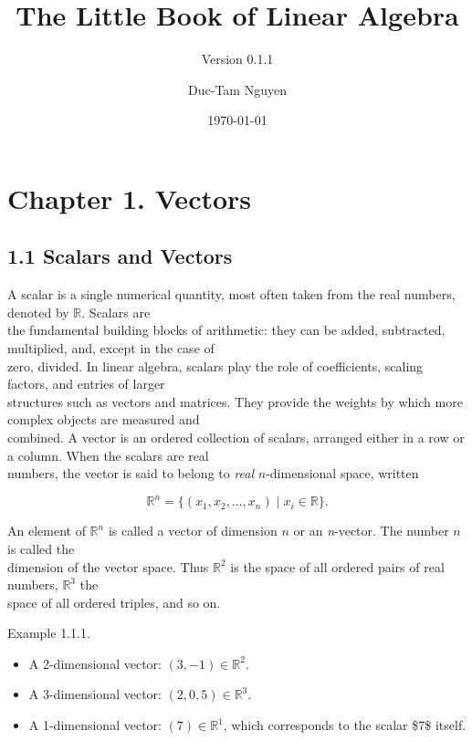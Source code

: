 \documentclass[
  12pt,
  a4paper,
]{article}
\title{The Little Book of Linear Algebra}
\subtitle{Version 0.1.1}
\author{Duc-Tam Nguyen}
\date{\today}
\let\oldsection\section
\renewcommand{\section}{\clearpage\oldsection}
\begin{document}
\maketitle

{
\hypersetup{linkcolor=}
\setcounter{tocdepth}{2}
\tableofcontents
}
\section{Chapter 1. Vectors}\label{chapter-1-vectors}

\subsection{1.1 Scalars and Vectors}\label{11-scalars-and-vectors}

A scalar is a single numerical quantity, most often taken from the real
numbers, denoted by \(\mathbb{R}\). Scalars are\\
the fundamental building blocks of arithmetic: they can be added,
subtracted, multiplied, and, except in the case of\\
zero, divided. In linear algebra, scalars play the role of coefficients,
scaling factors, and entries of larger\\
structures such as vectors and matrices. They provide the weights by
which more complex objects are measured and\\
combined. A vector is an ordered collection of scalars, arranged either
in a row or a column. When the scalars are real\\
numbers, the vector is said to belong to \emph{real} \(n\)-dimensional
space, written

\[\mathbb{R}^n = \{ (x_1, x_2, \dots, x_n) \mid x_i \in \mathbb{R} \}.\]

An element of \(\mathbb{R}^n\) is called a vector of dimension \(n\) or
an \emph{n}-vector. The number \(n\) is called the\\
dimension of the vector space. Thus \(\mathbb{R}^2\) is the space of all
ordered pairs of real numbers, \(\mathbb{R}^3\) the\\
space of all ordered triples, and so on.

Example 1.1.1.

\begin{itemize}
\item
  A 2-dimensional vector: \((3, -1) \in \mathbb{R}^2\).
\item
  A 3-dimensional vector: \((2, 0, 5) \in \mathbb{R}^3\).
\item
  A 1-dimensional vector: \((7) \in \mathbb{R}^1\), which corresponds to
  the scalar \$7\$ itself.
\end{itemize}
\end{document}
